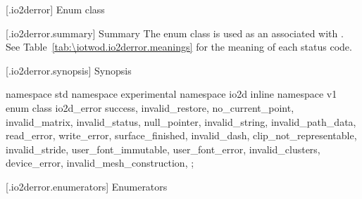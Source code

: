  [\iotwod.io2derror] {Enum class }

 [\iotwod.io2derror.summary] { Summary}
\pnum
The  enum class is used as an  
associated with . See 
Table~\ref{tab:\iotwod.io2derror.meanings} for the meaning of each
status code.

 [\iotwod.io2derror.synopsis] { Synopsis}

%
\begin{codeblock}
namespace std { namespace experimental { namespace io2d { inline namespace v1 {
  enum class io2d_error {
    success,
    invalid_restore,
    no_current_point,
    invalid_matrix,
    invalid_status,
    null_pointer,
    invalid_string,
    invalid_path_data,
    read_error,
    write_error,
    surface_finished,
    invalid_dash,
    clip_not_representable,
    invalid_stride,
    user_font_immutable,
    user_font_error,
    invalid_clusters,
    device_error,
    invalid_mesh_construction,
  };
} } } }
\end{codeblock}

 [\iotwod.io2derror.enumerators] { Enumerators}

